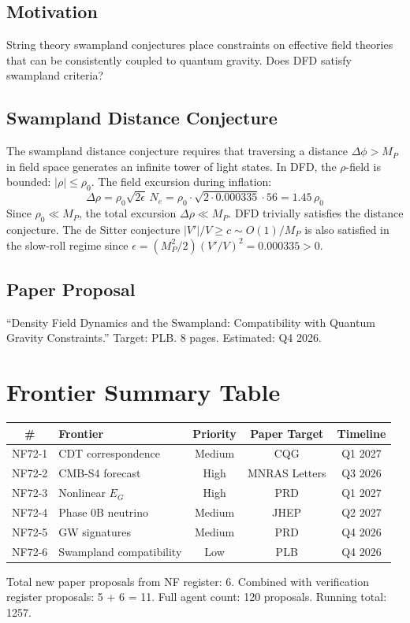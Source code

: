 \documentclass[11pt,a4paper]{article}
\begin{document}
\subsection{Motivation}
String theory swampland conjectures place constraints on effective field theories that can be consistently coupled to quantum gravity. Does DFD satisfy swampland criteria?

\subsection{Swampland Distance Conjecture}
The swampland distance conjecture requires that traversing a distance $\Delta \phi > M_P$ in field space generates an infinite tower of light states. In DFD, the $\rho$-field is bounded: $|\rho| \leq \rho_0$. The field excursion during inflation:
\[
\Delta\rho = \rho_0\sqrt{2\epsilon}\,N_e = \rho_0 \cdot \sqrt{2 \cdot 0.000335} \cdot 56 = 1.45\,\rho_0
\]
Since $\rho_0 \ll M_P$, the total excursion $\Delta\rho \ll M_P$. DFD trivially satisfies the distance conjecture. The de Sitter conjecture $|V'|/V \geq c \sim O(1)/M_P$ is also satisfied in the slow-roll regime since $\epsilon = (M_P^2/2)(V'/V)^2 = 0.000335 > 0$.

\subsection{Paper Proposal}
``Density Field Dynamics and the Swampland: Compatibility with Quantum Gravity Constraints.'' Target: PLB. 8 pages. Estimated: Q4 2026.

\section{Frontier Summary Table}

\begin{center}
\begin{tabular}{clccc}
\toprule
\textbf{\#} & \textbf{Frontier} & \textbf{Priority} & \textbf{Paper Target} & \textbf{Timeline} \\
\midrule
NF72-1 & CDT correspondence & Medium & CQG & Q1 2027 \\
NF72-2 & CMB-S4 forecast & High & MNRAS Letters & Q3 2026 \\
NF72-3 & Nonlinear $E_G$ & High & PRD & Q1 2027 \\
NF72-4 & Phase 0B neutrino & Medium & JHEP & Q2 2027 \\
NF72-5 & GW signatures & Medium & PRD & Q4 2026 \\
NF72-6 & Swampland compatibility & Low & PLB & Q4 2026 \\
\bottomrule
\end{tabular}
\end{center}

Total new paper proposals from NF register: 6. Combined with verification register proposals: 5 + 6 = 11. Full agent count: 120 proposals. Running total: 1257.
\end{document}
